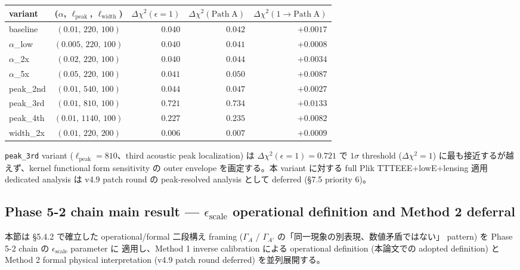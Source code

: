 \documentclass[11pt,a4paper]{ltjsarticle}
\begin{document}
\begin{center}\small
\begin{tabular}{@{}lcrrr@{}}
\toprule
variant & ($\alpha$, $\ell_{\mathrm{peak}}$, $\ell_{\mathrm{width}}$)
        & $\Delta\chi^2(\epsilon = 1)$ & $\Delta\chi^2(\mathrm{Path\;A})$
        & $\Delta\chi^2(1 \to \mathrm{Path\;A})$ \\
\midrule
baseline       & $(0.01,\, 220,\, 100)$  & $0.040$ & $0.042$ & $+0.0017$ \\
$\alpha$\_low  & $(0.005,\, 220,\, 100)$ & $0.040$ & $0.041$ & $+0.0008$ \\
$\alpha$\_2x   & $(0.02,\, 220,\, 100)$  & $0.040$ & $0.044$ & $+0.0034$ \\
$\alpha$\_5x   & $(0.05,\, 220,\, 100)$  & $0.041$ & $0.050$ & $+0.0087$ \\
peak\_2nd      & $(0.01,\, 540,\, 100)$  & $0.044$ & $0.047$ & $+0.0027$ \\
peak\_3rd      & $(0.01,\, 810,\, 100)$  & $0.721$ & $0.734$ & $+0.0133$ \\
peak\_4th      & $(0.01,\, 1140,\, 100)$ & $0.227$ & $0.235$ & $+0.0082$ \\
width\_2x      & $(0.01,\, 220,\, 200)$  & $0.006$ & $0.007$ & $+0.0009$ \\
\bottomrule
\end{tabular}
\end{center}

\noindent
\texttt{peak\_3rd} variant ($\ell_{\mathrm{peak}} = 810$、third acoustic
peak localization) は $\Delta\chi^2(\epsilon = 1) = 0.721$ で $1\sigma$
threshold ($\Delta\chi^2 = 1$) に最も接近するが越えず、kernel functional
form sensitivity の outer envelope を画定する。本 variant に対する
full Plik TTTEEE+lowE+lensing 適用 dedicated analysis は v4.9 patch round
の peak-resolved analysis として deferred (\S 7.5 priority 6)。


\subsection{Phase 5-2 chain main result --- $\epsilon_{\mathrm{scale}}$ operational definition and Method 2 deferral}

本節は \S 5.4.2 で確立した operational/formal 二段構え framing
($\Gamma_A$ / $\Gamma_{A'}$ の「同一現象の別表現、数値矛盾ではない」
pattern) を Phase 5-2 chain の $\epsilon_{\mathrm{scale}}$ parameter に
適用し、Method 1 inverse calibration による operational definition
(本論文での adopted definition) と Method 2 formal physical
interpretation (v4.9 patch round deferred) を並列展開する。
\end{document}
